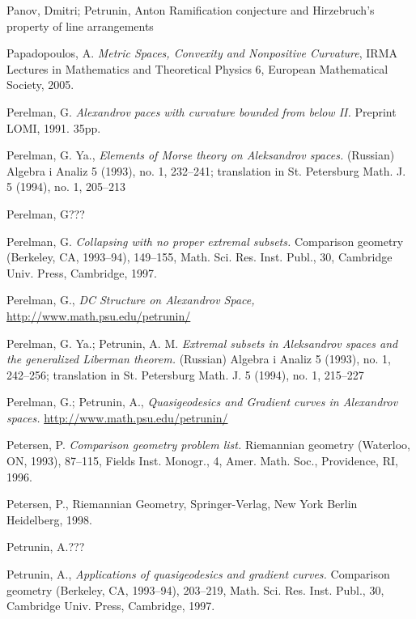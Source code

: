 \begin{thebibliography}{52}
Panov, Dmitri; Petrunin, Anton
Ramification conjecture and Hirzebruch's property of line arrangements

  Papadopoulos, A.
\textit{Metric Spaces, Convexity and Nonpositive Curvature},
IRMA Lectures in Mathematics and Theoretical Physics 6, European Mathematical Society, 2005. 


 Perelman, G. \textit{Alexandrov paces with curvature
bounded from below II.} Preprint LOMI, 1991. 35pp.

Perelman, G. Ya., \textit{Elements of Morse theory on
Aleksandrov spaces.} (Russian)  Algebra i Analiz  5  (1993),  no. 1, 232--241; 
translation in  St. Petersburg Math. J.  5  (1994),  no. 1, 205--213

Perelman, G???

 Perelman, G. \textit{Collapsing with no proper extremal subsets.}  Comparison geometry (Berkeley, CA, 1993--94),  149--155,
Math. Sci. Res. Inst. Publ., 30, Cambridge Univ. Press, Cambridge, 1997.


 Perelman, G., \textit{DC Structure on Alexandrov Space,}\\ \href{http://www.math.psu.edu/petrunin/papers/papers.html}{http://www.math.psu.edu/petrunin/}

 Perelman, G. Ya.; Petrunin, A. M.
\textit{Extremal subsets in Aleksandrov spaces and the generalized Liberman theorem.}
(Russian)  Algebra i Analiz  5  (1993),  no. 1, 242--256;  translation in  St.
Petersburg Math. J.  5  (1994),  no. 1, 215--227

 Perelman, G.; Petrunin,  A., \textit{Quasigeodesics and Gradient curves in Alexandrov spaces.}
 \href{http://www.math.psu.edu/petrunin/papers/papers.html}{http://www.math.psu.edu/petrunin/}

 Petersen, P. \textit{Comparison geometry problem list.} Riemannian geometry (Waterloo, ON, 1993), 87--115,
Fields Inst. Monogr., 4, Amer. Math. Soc., Providence, RI, 1996. 

 Petersen, P., Riemannian Geometry,
Springer-Verlag, New York Berlin Heidelberg, 1998.

Petrunin, A.???

 Petrunin, A., \textit{Applications of quasigeodesics
and gradient curves.}  Comparison geometry (Berkeley, CA, 1993--94),  203--219,
Math. Sci. Res. Inst. Publ., 30, Cambridge Univ. Press, Cambridge, 1997.


\end{thebibliography}
